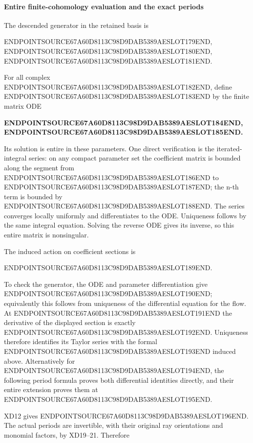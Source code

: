 \paragraph{Entire finite-cohomology evaluation and the exact periods}\label{endpoint-f1_scaling--entire-finite-cohomology-evaluation-and-the-exact-periods}

The descended generator in the retained basis is

ENDPOINTSOURCE67A60D8113C98D9DAB5389AESLOT179END, ENDPOINTSOURCE67A60D8113C98D9DAB5389AESLOT180END, ENDPOINTSOURCE67A60D8113C98D9DAB5389AESLOT181END.

For all complex ENDPOINTSOURCE67A60D8113C98D9DAB5389AESLOT182END, define ENDPOINTSOURCE67A60D8113C98D9DAB5389AESLOT183END by the finite matrix ODE

\textbf{ENDPOINTSOURCE67A60D8113C98D9DAB5389AESLOT184END, ENDPOINTSOURCE67A60D8113C98D9DAB5389AESLOT185END.}

Its solution is entire in these parameters. One direct verification is the iterated-integral series: on any compact parameter set the coefficient matrix is bounded along the segment from ENDPOINTSOURCE67A60D8113C98D9DAB5389AESLOT186END to ENDPOINTSOURCE67A60D8113C98D9DAB5389AESLOT187END; the n-th term is bounded by ENDPOINTSOURCE67A60D8113C98D9DAB5389AESLOT188END. The series converges locally uniformly and differentiates to the ODE. Uniqueness follows by the same integral equation. Solving the reverse ODE gives its inverse, so this entire matrix is nonsingular.

The induced action on coefficient sections is

ENDPOINTSOURCE67A60D8113C98D9DAB5389AESLOT189END.

To check the generator, the ODE and parameter differentiation give ENDPOINTSOURCE67A60D8113C98D9DAB5389AESLOT190END; equivalently this follows from uniqueness of the differential equation for the flow. At ENDPOINTSOURCE67A60D8113C98D9DAB5389AESLOT191END the derivative of the displayed section is exactly ENDPOINTSOURCE67A60D8113C98D9DAB5389AESLOT192END. Uniqueness therefore identifies its Taylor series with the formal ENDPOINTSOURCE67A60D8113C98D9DAB5389AESLOT193END induced above. Alternatively for ENDPOINTSOURCE67A60D8113C98D9DAB5389AESLOT194END, the following period formula proves both differential identities directly, and their entire extension proves them at ENDPOINTSOURCE67A60D8113C98D9DAB5389AESLOT195END.

XD12 gives ENDPOINTSOURCE67A60D8113C98D9DAB5389AESLOT196END. The actual periods are invertible, with their original ray orientations and monomial factors, by XD19--21. Therefore

